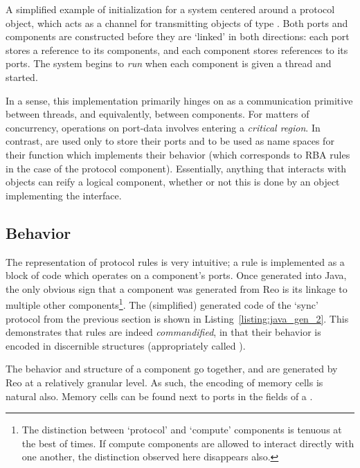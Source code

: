 \begin{listing}[ht]
	\centering
	\inputminted[]{java}{java_gen_1.java}
	\caption[Reo-generated Java protocol initialization.]{A simplified example of initialization for a system centered around a  protocol object, which acts as a channel for transmitting objects of type . Both ports and components are constructed before they are `linked' in both directions: each port stores a reference to its components, and each component stores references to its ports. The system begins to \textit{run} when each component is given a thread and started.}
	\label{listing:java_gen_1}
\end{listing}


In a sense, this implementation primarily hinges on  as a communication primitive between threads, and equivalently, between components. For matters of concurrency, operations on port-data involves entering a \textit{critical region}. In contrast,  are used only to store their ports and to be used as name spaces for their  function which implements their behavior (which corresponds to RBA rules in the case of the protocol component). Essentially, anything that interacts with  objects can reify a logical component, whether or not this is done by an object implementing the  interface.

\subsection{Behavior}
The representation of protocol rules is very intuitive; a rule is implemented as a block of code which operates on a component's ports. Once generated into Java, the only obvious sign that a component was generated from Reo is its linkage to multiple other components\footnote{The distinction between `protocol' and `compute' components is tenuous at the best of times. If compute components are allowed to interact directly with one another, the distinction observed here disappears also.}. The (simplified) generated  code of the `sync' protocol from the previous section is shown in Listing~\ref{listing:java_gen_2}. This demonstrates that rules are indeed \textit{commandified}, in that their behavior is encoded in discernible structures (appropriately called ).

The behavior and structure of a component go together, and are generated by Reo at a relatively granular level. As such, the encoding of memory cells is natural also. Memory cells can be found next to ports in the fields of a .

